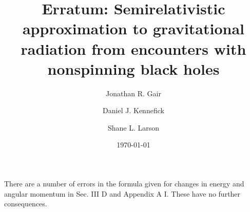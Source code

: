 \documentclass[aps,prd,amsfonts,amssymb,amsmath,nofootinbib,reprint,showpacs]{revtex4-1}
\begin{document}

\title{Erratum: Semirelativistic approximation to gravitational radiation from encounters
with nonspinning black holes\\[Phys. Rev. D 72, 084009 (2005)]}

\author{Jonathan R. Gair}
\author{Daniel J. Kennefick}
\author{Shane L. Larson}

\date{\today}


\maketitle

There are a number of errors in the formula given for changes in energy and angular momentum in Sec. III D and Appendix A I. These have no further consequences.
\end{document}
